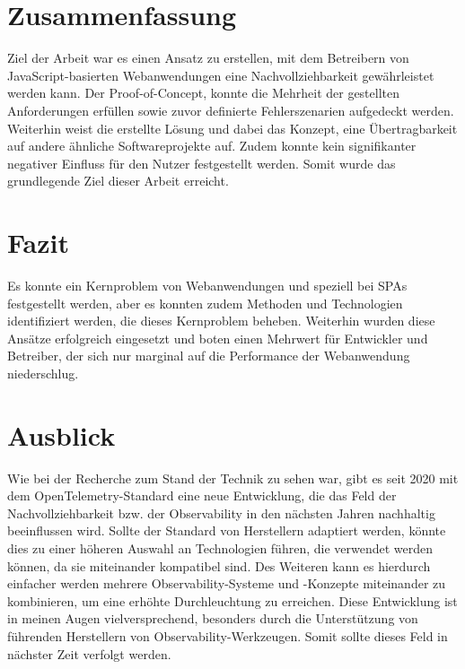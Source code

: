 
\section{Zusammenfassung}

Ziel der Arbeit war es einen Ansatz zu erstellen, mit dem Betreibern von JavaScript-basierten Webanwendungen eine Nachvollziehbarkeit gewährleistet werden kann. Der Proof-of-Concept, konnte die Mehrheit der gestellten Anforderungen erfüllen sowie zuvor definierte Fehlerszenarien aufgedeckt werden. Weiterhin weist die erstellte Lösung und dabei das Konzept, eine Übertragbarkeit auf andere ähnliche Softwareprojekte auf. Zudem konnte kein signifikanter negativer Einfluss für den Nutzer festgestellt werden. Somit wurde das grundlegende Ziel dieser Arbeit erreicht.

\section{Fazit}

Es konnte ein Kernproblem von Webanwendungen und speziell bei SPAs festgestellt werden, aber es konnten zudem Methoden und Technologien identifiziert werden, die dieses Kernproblem beheben. Weiterhin wurden diese Ansätze erfolgreich eingesetzt und boten einen Mehrwert für Entwickler und Betreiber, der sich nur marginal auf die Performance der Webanwendung niederschlug.

\section{Ausblick}

Wie bei der Recherche zum Stand der Technik zu sehen war, gibt es seit 2020 mit dem OpenTelemetry-Standard eine neue Entwicklung, die das Feld der Nachvollziehbarkeit bzw. der Observability in den nächsten Jahren nachhaltig beeinflussen wird. Sollte der Standard von Herstellern adaptiert werden, könnte dies zu einer höheren Auswahl an Technologien führen, die verwendet werden können, da sie miteinander kompatibel sind. Des Weiteren kann es hierdurch einfacher werden mehrere Observability-Systeme und -Konzepte miteinander zu kombinieren, um eine erhöhte Durchleuchtung zu erreichen. Diese Entwicklung ist in meinen Augen vielversprechend, besonders durch die Unterstützung von führenden Herstellern von Observability-Werkzeugen. Somit sollte dieses Feld in nächster Zeit verfolgt werden.